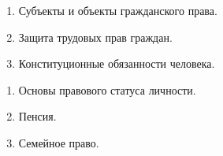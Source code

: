 \newpage


\shapkFull
\setcounter{zad}{0}

\begin{enumerate}
	\item Субъекты и объекты гражданского права.

	\item Защита трудовых прав граждан.

	\item Конституционные обязанности человека.

\end{enumerate}

\newpage


\shapkFull
\setcounter{zad}{0}

\begin{enumerate}
	\item Основы правового статуса личности.

	\item Пенсия.

	\item Семейное право.
\end{enumerate}

\newpage